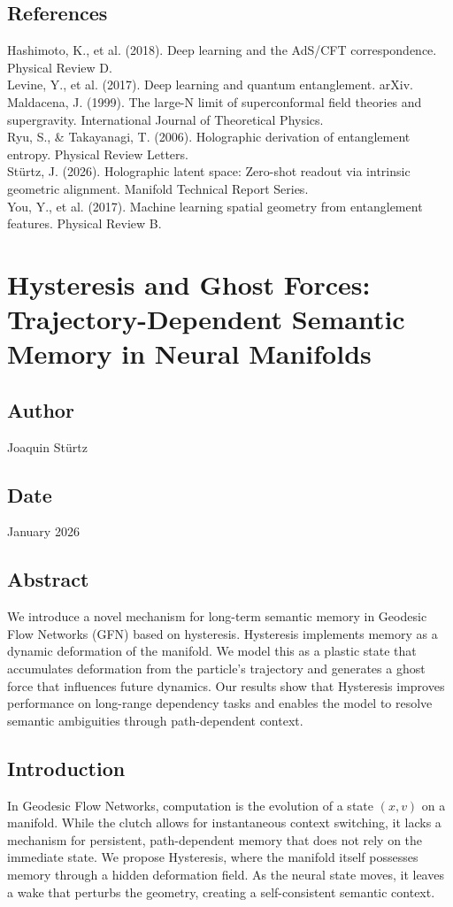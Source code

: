 \documentclass{article}
\numberwithin{equation}{section}
\begin{document}
\subsection*{References}
Hashimoto, K., et al. (2018). Deep learning and the AdS/CFT correspondence. Physical Review D.\\
Levine, Y., et al. (2017). Deep learning and quantum entanglement. arXiv.\\
Maldacena, J. (1999). The large-N limit of superconformal field theories and supergravity. International Journal of Theoretical Physics.\\
Ryu, S., \& Takayanagi, T. (2006). Holographic derivation of entanglement entropy. Physical Review Letters.\\
Stürtz, J. (2026). Holographic latent space: Zero-shot readout via intrinsic geometric alignment. Manifold Technical Report Series.\\
You, Y., et al. (2017). Machine learning spatial geometry from entanglement features. Physical Review B.

\section{Hysteresis and Ghost Forces: Trajectory-Dependent Semantic Memory in Neural Manifolds}
\subsection*{Author}
Joaquin Stürtz
\subsection*{Date}
January 2026
\subsection*{Abstract}
We introduce a novel mechanism for long-term semantic memory in Geodesic Flow Networks (GFN) based on hysteresis. Hysteresis implements memory as a dynamic deformation of the manifold. We model this as a plastic state that accumulates deformation from the particle's trajectory and generates a ghost force that influences future dynamics. Our results show that Hysteresis improves performance on long-range dependency tasks and enables the model to resolve semantic ambiguities through path-dependent context.

\subsection{Introduction}
In Geodesic Flow Networks, computation is the evolution of a state $(x, v)$ on a manifold. While the clutch allows for instantaneous context switching, it lacks a mechanism for persistent, path-dependent memory that does not rely on the immediate state.
We propose Hysteresis, where the manifold itself possesses memory through a hidden deformation field. As the neural state moves, it leaves a wake that perturbs the geometry, creating a self-consistent semantic context.
\end{document}
